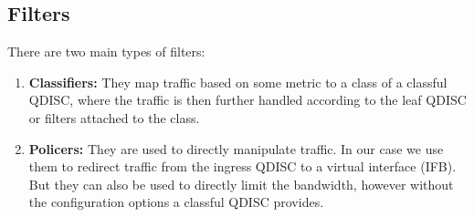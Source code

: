 \subsection{Filters}
There are two main types of filters:
\begin{enumerate}
\item \textbf{Classifiers:} They map traffic based on some metric to a class of a classful \acs{QDISC}, where the traffic is then further handled according to the leaf \acs{QDISC} or filters attached to the class.
\item \textbf{Policers:} They are used to directly manipulate traffic. In our case we use them to redirect traffic from the ingress \acs{QDISC} to a virtual interface (\ac{IFB}). But they can also be used to directly limit the bandwidth, however without the configuration options a classful \acs{QDISC} provides.
\end{enumerate}